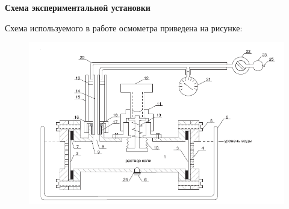 

\textbf{\Large Схема экспериментальной установки}

Схема используемого в работе осмометра приведена на рисунке:

\begin{figure}[H]
	\centering
	\includegraphics[width=1 \textwidth]{../images/scheme_experiment.png}
\end{figure}

